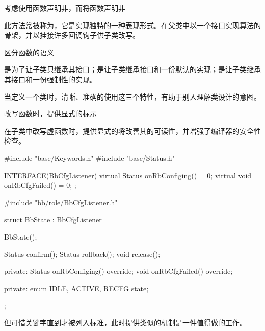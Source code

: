 \begin{content}
\begin{regulation}
考虑使用函数声明非，而将函数声明非
\end{regulation}

此方法常被称为，它是实现独特的一种表现形式。在父类中以一个接口实现算法的骨架，并以挂接许多回调钩子供子类改写。

\begin{regulation}
区分函数的语义
\end{regulation}

是为了让子类只继承其接口；是让子类继承接口和一份默认的实现；是让子类继承其接口和一份强制性的实现。

当定义一个类时，清晰、准确的使用这三个特性，有助于别人理解类设计的意图。

\begin{regulation}
改写函数时，提供显式的标示
\end{regulation}

在子类中改写虚函数时，提供显式的将改善其的可读性，并增强了编译器的安全性检查。

\begin{leftbar}
\begin{c++}
#include "base/Keywords.h"
#include "base/Status.h"

INTERFACE(BbCfgListener)
{
    virtual Status onRbConfiging() = 0;     
    virtual void onRbCfgFailed() = 0;
};
\end{c++}
\end{leftbar}

\begin{leftbar}
\begin{c++}
#include "bb/role/BbCfgListener.h"

struct BbState : BbCfgListener
{
    BbState();    
   
    Status confirm();
    Status rollback();
    void   release();

private:
    Status onRbConfiging() override; 
    void   onRbCfgFailed() override;

private:    
    enum{ IDLE, ACTIVE, RECFG } state;
};
\end{c++}
\end{leftbar}

但可惜关键字直到才被列入标准，此时提供类似的机制是一件值得做的工作。


\end{content}
